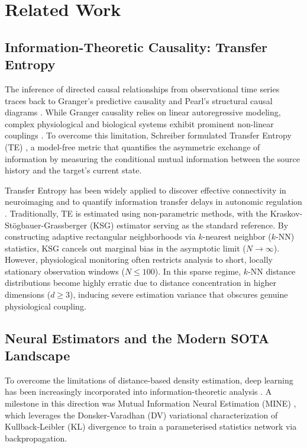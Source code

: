 \section{Related Work}

\subsection{Information-Theoretic Causality: Transfer Entropy}
The inference of directed causal relationships from observational time series traces back to Granger's predictive causality \cite{granger1969investigating} and Pearl's structural causal diagrams \cite{pearl2009causality}. While Granger causality relies on linear autoregressive modeling, complex physiological and biological systems exhibit prominent non-linear couplings \cite{runge2019inferring}. To overcome this limitation, Schreiber formulated Transfer Entropy (TE) \cite{schreiber2000measuring}, a model-free metric that quantifies the asymmetric exchange of information by measuring the conditional mutual information between the source history and the target's current state.

Transfer Entropy has been widely applied to discover effective connectivity in neuroimaging \cite{vicente2011transfer} and to quantify information transfer delays in autonomic regulation \cite{wibral2013measuring}. Traditionally, TE is estimated using non-parametric methods, with the Kraskov-St{\"o}gbauer-Grassberger (KSG) estimator \cite{kraskov2004estimating} serving as the standard reference. By constructing adaptive rectangular neighborhoods via $k$-nearest neighbor ($k$-NN) statistics, KSG cancels out marginal bias in the asymptotic limit ($N \to \infty$). However, physiological monitoring often restricts analysis to short, locally stationary observation windows ($N \le 100$). In this sparse regime, $k$-NN distance distributions become highly erratic due to distance concentration in higher dimensions ($d \ge 3$), inducing severe estimation variance that obscures genuine physiological coupling.

\subsection{Neural Estimators and the Modern SOTA Landscape}
To overcome the limitations of distance-based density estimation, deep learning has been increasingly incorporated into information-theoretic analysis \cite{fawaz2019deep}. A milestone in this direction was Mutual Information Neural Estimation (MINE) \cite{belghazi2018mine}, which leverages the Donsker-Varadhan (DV) variational characterization of Kullback-Leibler (KL) divergence \cite{donsker1975asymptotic} to train a parameterised statistics network via backpropagation.

